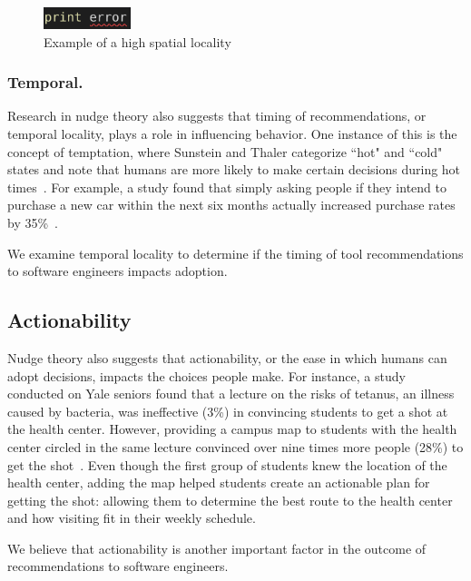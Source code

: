 \begin{figure}
\centering
	\includegraphics[width=1in]{images/error.png}
	\caption{Example of a high spatial locality}	
	\label{fig:spatial} 
\end{figure}

\subsubsection{Temporal.}

Research in nudge theory also suggests that timing of recommendations, or temporal locality, plays a role in influencing behavior. One instance of this is the concept of temptation, where Sunstein and Thaler categorize ``hot" and ``cold" states and note that humans are more likely to make certain decisions during hot times~\cite[p.~41]{sunstein2008nudge}. For example, a study found that simply asking people if they intend to purchase a new car within the next six months actually increased purchase rates by 35\%~\cite{morwitz1993intent}. 

We examine temporal locality to determine if the timing of tool recommendations to software engineers impacts adoption. 

\subsection{Actionability}

Nudge theory also suggests that actionability, or the ease in which humans can adopt decisions, impacts the choices people make. For instance, a study conducted on Yale seniors found that a lecture on the risks of tetanus, an illness caused by bacteria, was ineffective (3\%) in convincing students to get a shot at the health center. However, providing a campus map to students with the health center circled in the same lecture convinced over nine times more people (28\%) to get the shot~\cite{leventhal1965specificity}. Even though the first group of students knew the location of the health center, adding the map helped students create an actionable plan for getting the shot: allowing them to determine the best route to the health center and how visiting fit in their weekly schedule.

We believe that actionability is another important factor in the outcome of recommendations to software engineers. 

% 
